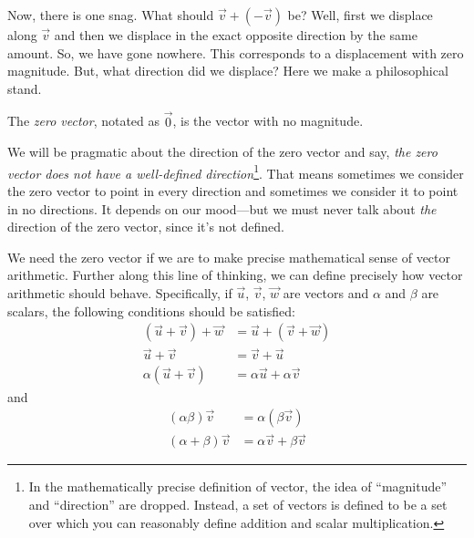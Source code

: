 \begin{center}
	\usetikzlibrary{patterns,decorations.pathreplacing}
\end{center}

Now, there is one snag.  What should $\vec v+(-\vec v)$ be?  Well, first we
displace along $\vec v$ and then we displace in the exact opposite direction 
by the same amount.  So, we have gone nowhere.  This corresponds to a displacement
with zero magnitude.  But, what direction did we displace?  Here we make a philosophical
stand.
\begin{definition}
	The \emph{zero vector}, notated as $\vec 0$, 
	is the vector with no magnitude.
\end{definition}
We will be pragmatic about the direction of the zero vector and say,
\emph{the zero vector does not have a well-defined direction}\footnote{
	In the mathematically precise definition of vector, the idea of ``magnitude''
	and ``direction'' are dropped.  Instead, a set of vectors is defined to be
	a set over which you can reasonably define addition and scalar multiplication.
}.  That means
sometimes we consider the zero vector to point in every direction and sometimes
we consider it to point in no directions.  It depends on our mood---but we must
never talk about \emph{the} direction of the zero vector, since it's not defined.

We need the zero vector if we are to make precise mathematical
sense of vector arithmetic.
Further along this line of thinking, we can define precisely how vector arithmetic
should behave.  Specifically, if $\vec u$, $\vec v$, $\vec w$ are vectors and $\alpha$ and $\beta$
are scalars, the
following conditions should be satisfied:
\begin{align*}
	(\vec u+\vec v)+\vec w&=\vec u+(\vec v+\vec w)\tag{Associativity}\\
	\vec u+\vec v&=\vec v+\vec u\tag{Commutativity}\\
	\alpha(\vec u+\vec v)&=\alpha\vec u+\alpha \vec v\tag{Distributivity}
\end{align*}
and 
\begin{align*}
	(\alpha\beta)\vec v&=\alpha(\beta \vec v)\tag{Associativity II}\\
	(\alpha+\beta)\vec v&=\alpha\vec v+\beta \vec v\tag{Distributivity II}
\end{align*}

